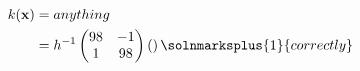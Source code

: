 \begin{align*}k(\mathbf{x}) & =anything                                                     \\
                            & =h^{-1}\begin{pmatrix}
	                                     98 & -1 \\
	                                     1  & 98
                                     \end{pmatrix}\left(\right)\solnmarksplus{1}{correctly} \\
\end{align*}
